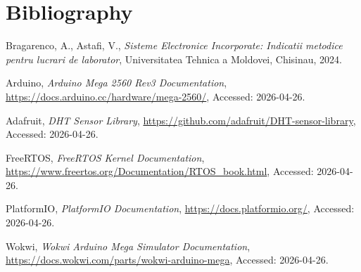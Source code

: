 \section{Bibliography}

\begin{enumerate}[label={[\arabic*]}]
    \item Bragarenco, A., Astafi, V., \textit{Sisteme Electronice Incorporate: Indicatii metodice pentru lucrari de laborator}, Universitatea Tehnica a Moldovei, Chisinau, 2024.
    \item Arduino, \textit{Arduino Mega 2560 Rev3 Documentation}, \url{https://docs.arduino.cc/hardware/mega-2560/}, Accessed: 2026-04-26.
    \item Adafruit, \textit{DHT Sensor Library}, \url{https://github.com/adafruit/DHT-sensor-library}, Accessed: 2026-04-26.
    \item FreeRTOS, \textit{FreeRTOS Kernel Documentation}, \url{https://www.freertos.org/Documentation/RTOS_book.html}, Accessed: 2026-04-26.
    \item PlatformIO, \textit{PlatformIO Documentation}, \url{https://docs.platformio.org/}, Accessed: 2026-04-26.
    \item Wokwi, \textit{Wokwi Arduino Mega Simulator Documentation}, \url{https://docs.wokwi.com/parts/wokwi-arduino-mega}, Accessed: 2026-04-26.
\end{enumerate}
